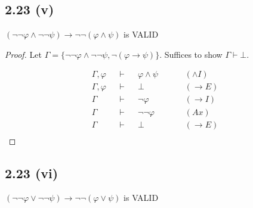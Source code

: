 \documentclass[12pt]{article}
\begin{document}
\subsection*{2.23 (v)} 
$(\neg \neg \varphi \wedge \neg \neg \psi) \rightarrow \neg \neg (\varphi \wedge \psi)$ is VALID

\begin{proof}
Let $\Gamma = \{\neg \neg \varphi \wedge \neg \neg \psi, \neg(\varphi \rightarrow \psi)\}$. Suffices to show $\Gamma \vdash \bot$.

\begin{align*}
    \Gamma, \varphi &&\vdash&& \varphi \wedge \psi &&&& (\wedge I) \\
    \Gamma, \varphi &&\vdash&& \bot &&&& (\rightarrow E) \\
    \Gamma &&\vdash&& \neg \varphi &&&& (\rightarrow I) \\
    \Gamma &&\vdash&& \neg \neg \varphi &&&& (Ax) \\
    \Gamma &&\vdash&& \bot &&&& (\rightarrow E) \\
\end{align*}
\end{proof}

\subsection*{2.23 (vi)} 
$(\neg \neg \varphi \vee \neg \neg \psi) \rightarrow \neg \neg (\varphi \vee \psi)$ is VALID
\end{document}
